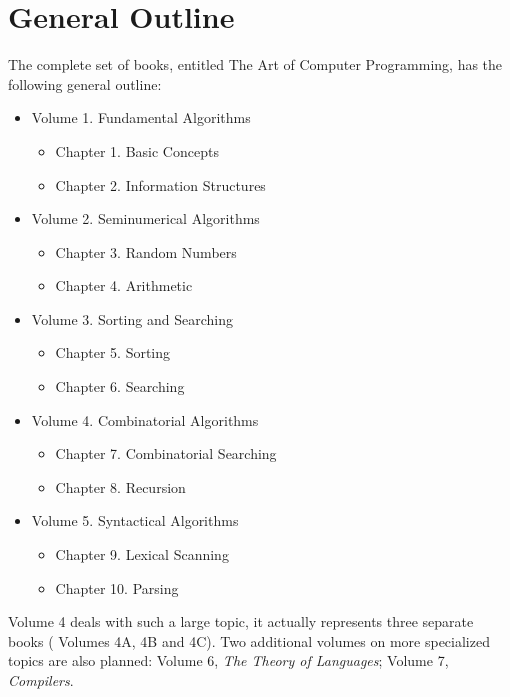 \documentclass{article}
\begin{document}
\section{General Outline}
The complete set of books, entitled The Art of Computer Programming, has the following general outline:
\begin{itemize}
    \item[] Volume 1. Fundamental Algorithms 
        \begin{itemize}
            \item[] Chapter 1. Basic Concepts
            \item[] Chapter 2. Information Structures
        \end{itemize}
    \item[] Volume 2. Seminumerical Algorithms 
        \begin{itemize}
            \item[] Chapter 3. Random Numbers
            \item[] Chapter 4. Arithmetic
        \end{itemize}    
    \item[] Volume 3. Sorting and Searching
        \begin{itemize}
            \item[] Chapter 5. Sorting
            \item[] Chapter 6. Searching
        \end{itemize}    
    \item[] Volume 4. Combinatorial Algorithms 
        \begin{itemize}
            \item[] Chapter 7. Combinatorial Searching
            \item[] Chapter 8. Recursion
        \end{itemize}
    \item[] Volume 5. Syntactical Algorithms
        \begin{itemize}
            \item[] Chapter 9. Lexical Scanning
            \item[] Chapter 10. Parsing
        \end{itemize}
\end{itemize}

Volume 4 deals with such a large topic, it actually represents three separate books ( Volumes 4A, 4B and 4C). Two additional volumes on more specialized topics are also planned: Volume 6, \textit{The Theory of Languages}; Volume 7, \textit{Compilers}.
\end{document}
